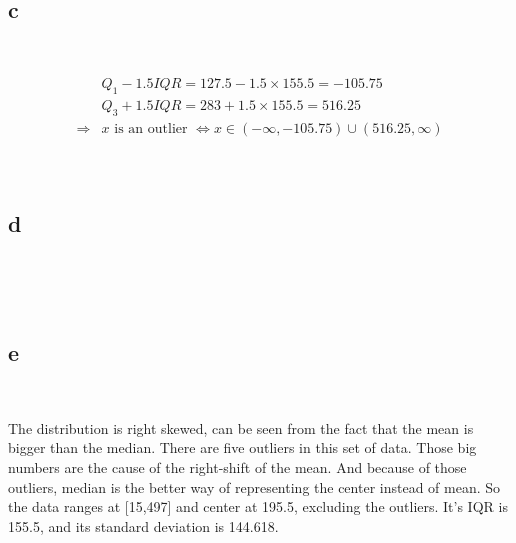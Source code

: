 \documentclass{article}
\begin{document}
~

\subsection*{c}

~

\begin{align*}
    &Q_1-1.5IQR=127.5-1.5\times 155.5=-105.75\\
    &Q_3+1.5IQR=283+1.5\times 155.5=516.25\\
    \Rightarrow&x\text{ is an outlier }\Leftrightarrow x\in(-\infty,-105.75)\cup(516.25,\infty)\\
\end{align*}

~

\subsection*{d}

~


~

\subsection*{e}

~

The distribution is right skewed, can be seen from the fact that the mean is bigger than the median. There are five outliers in this set of data. Those big numbers are the cause of the right-shift of the mean. And because of those outliers, median is the better way of representing the center instead of mean. So the data ranges at [15,497] and center at 195.5, excluding the outliers. It's IQR is 155.5, and its standard deviation is 144.618.
\end{document}
